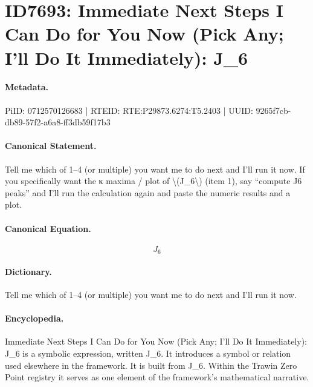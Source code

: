 \section*{ID7693: Immediate Next Steps I Can Do for You Now (Pick Any; I’ll Do It Immediately): J\_6}
\paragraph{Metadata.}
PiID: 0712570126683 | RTEID: RTE:P29873.6274:T5.2403 | UUID: 9265f7cb-db89-57f2-a6a8-ff3db59f17b3

\paragraph{Canonical Statement.}
Tell me which of 1–4 (or multiple) you want me to do next and I’ll run it now. If you specifically want the κ maxima / plot of \textbackslash{}(J\_6\textbackslash{}) (item 1), say “compute J6 peaks” and I’ll run the calculation again and paste the numeric results and a plot.

\paragraph{Canonical Equation.}
\[
J_6
\]

\paragraph{Dictionary.}
Tell me which of 1–4 (or multiple) you want me to do next and I’ll run it now.

\paragraph{Encyclopedia.}
Immediate Next Steps I Can Do for You Now (Pick Any; I’ll Do It Immediately): J\_6 is a symbolic expression, written J\_6. It introduces a symbol or relation used elsewhere in the framework. It is built from J\_6. Within the Trawin Zero Point registry it serves as one element of the framework's mathematical narrative.
